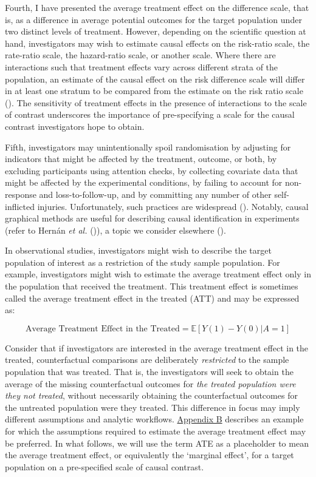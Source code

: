 \documentclass[
  single column]{article}
\begin{document}
Fourth, I have presented the average treatment effect on the difference
scale, that is, as a difference in average potential outcomes for the
target population under two distinct levels of treatment. However,
depending on the scientific question at hand, investigators may wish to
estimate causal effects on the risk-ratio scale, the rate-ratio scale,
the hazard-ratio scale, or another scale. Where there are interactions
such that treatment effects vary across different strata of the
population, an estimate of the causal effect on the risk difference
scale will differ in at least one stratum to be compared from the
estimate on the risk ratio scale
(). The
sensitivity of treatment effects in the presence of interactions to the
scale of contrast underscores the importance of pre-specifying a scale
for the causal contrast investigators hope to obtain.

Fifth, investigators may unintentionally spoil randomisation by
adjusting for indicators that might be affected by the treatment,
outcome, or both, by excluding participants using attention checks, by
collecting covariate data that might be affected by the experimental
conditions, by failing to account for non-response and
loss-to-follow-up, and by committing any number of other self-inflicted
injuries. Unfortunately, such practices are widespread
(). Notably,
causal graphical methods are useful for describing causal identification
in experiments (refer to Hernán \emph{et al.}
()), a topic we consider elsewhere
().

In observational studies, investigators might wish to describe the
target population of interest as a restriction of the study sample
population. For example, investigators might wish to estimate the
average treatment effect only in the population that received the
treatment. This treatment effect is sometimes called the average
treatment effect in the treated (ATT) and may be expressed as:

\[
\text{Average Treatment Effect in the Treated} = \mathbb{E}[Y(1) - Y(0) | A = 1]
\]

Consider that if investigators are interested in the average treatment
effect in the treated, counterfactual comparisons are deliberately
\emph{restricted} to the sample population that was treated. That is,
the investigators will seek to obtain the average of the missing
counterfactual outcomes for \emph{the treated population were they not
treated}, without necessarily obtaining the counterfactual outcomes for
the untreated population were they treated. This difference in focus may
imply different assumptions and analytic workflows.
\hyperref[id-app-b]{Appendix B} describes an example for which the
assumptions required to estimate the average treatment effect may be
preferred. In what follows, we will use the term ATE as a placeholder to
mean the average treatment effect, or equivalently the `marginal
effect', for a target population on a pre-specified scale of causal
contrast.
\end{document}
